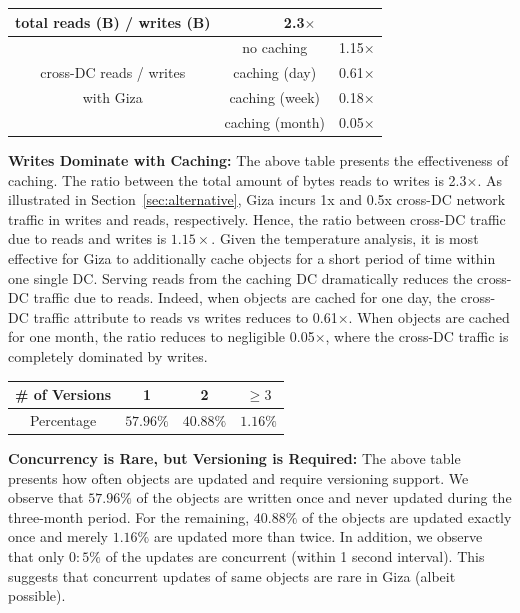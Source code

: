 \begin{table}[h]
\footnotesize
\centering
\begin{tabular}{|c||c|c|}
\hline \hline
total reads (B) / writes (B) 	& \multicolumn{2}{c|}{2.3$\times$}
\\ \hline \hline
	& no caching		& 1.15$\times$
\\ \cline{2-3}
cross-DC reads / writes
	& caching (day)		& 0.61$\times$ 
\\ \cline{2-3}
with Giza
	& caching (week)	& 0.18$\times$ 
\\ \cline{2-3}
	& caching (month)	& 0.05$\times$ 
\\ \hline \hline
\end{tabular}
\label{tab:caching}
\end{table}
{\bf Writes Dominate with Caching:} The above table presents the effectiveness of caching. The ratio between the total amount of bytes reads to writes is 2.3$\times$. 
As illustrated in Section~\ref{sec:alternative}, Giza incurs 1x and 0.5x cross-DC network traffic in writes and reads, respectively. Hence, the ratio between cross-DC traffic due to reads and writes is $1.15\times$. Given the temperature analysis, it is most effective for Giza to additionally cache  objects for a short period of time within one single DC. Serving reads from the caching DC dramatically reduces the cross-DC traffic due to reads. Indeed, when objects are cached for one day, the cross-DC traffic attribute to reads vs writes reduces to 0.61$\times$. When objects are cached for one month, the ratio reduces to negligible 0.05$\times$, where the cross-DC traffic is completely dominated by writes.

\begin{table}[h]
\footnotesize
\centering
\begin{tabular}{c||c|c|c}
\# of Versions 	& 	1				& 2					& $\ge 3$
\\ \hline
Percentage			& $57.96\%$	& $40.88\%$	& $1.16\%$
\end{tabular}
\label{tab:version}
\end{table}
{\bf Concurrency is Rare, but Versioning is Required:} The above table presents how often objects are updated and require versioning support. We observe that $57.96\%$ of the objects are written once and never updated during the three-month period. For the remaining, $40.88\%$ of the objects are updated exactly once and merely $1.16\%$ are updated more than twice. In addition, we observe that only $0:5\%$ of the updates
are concurrent (within 1 second interval). This suggests that concurrent updates of same objects are rare in Giza (albeit possible).

